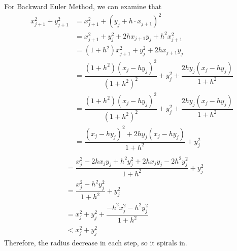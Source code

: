 \documentclass{article}
\begin{document}
\begin{enumerate}
 For Backward Euler Method, we can examine that \begin{align*}
  x_{j+1}^2+y_{j+1}^2&=x_{j+1}^2+(y_j+h\cdot x_{j+1})^2\\
 &= x_{j+1}^2+y_j^2+2h x_{j+1}y_j+h^2x_{j+1}^2\\
 &=(1+h^2) x_{j+1}^2+y_j^2+2h x_{j+1}y_j\\
  &=\dfrac{(1+h^2)(x_j-hy_j)^2}{(1+h^2)^2}+y_j^2+\dfrac{2hy_j(x_j-hy_j)}{1+h^2}\\
   &=\dfrac{(1+h^2)(x_j-hy_j)^2}{(1+h^2)^2}+y_j^2+\dfrac{2hy_j(x_j-hy_j)}{1+h^2}\\
 &=\dfrac{(x_j-hy_j)^2+2hy_j(x_j-hy_j)}{1+h^2}+y_j^2\\
         \end{align*}\begin{align*}
  &=\dfrac{x_j^2-2hx_jy_j+h^2y_j^2+2hx_jy_j-2h^2y_j^2}{1+h^2}+y_j^2\\
    &=\dfrac{x_j^2-h^2y_j^2}{1+h^2}+y_j^2\\
    &=x_j^2+y_j^2+\dfrac{-h^2x_j^2-h^2y_j^2}{1+h^2}\\
    & < x_j^2+y_j^2
 \end{align*}
  Therefore, the radius decrease in each step, so it spirals in.
  

\end{enumerate}
\end{document}
